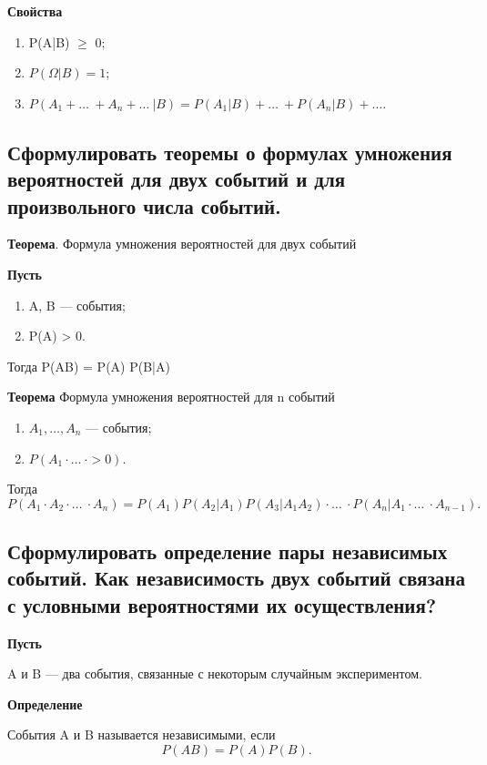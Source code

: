 \textbf{Свойства}

\begin{enumerate}
	\item P(A|B) $\geqslant$ 0;
	\item $P(\Omega|B) = 1$;
	\item $P(A_1 + \dots\ + A_n + \dots\ | B) = P(A_1|B) + \dots\ + P(A_n|B) + \dots$.
\end{enumerate}

\subsection{Сформулировать теоремы о формулах умножения вероятностей для двух событий и для произвольного числа событий.}

\textbf{Теорема}. Формула умножения вероятностей для двух событий 

\textbf{Пусть}

\begin{enumerate}
	\item A, B --- события;
	\item P(A) > 0.
\end{enumerate}

Тогда P(AB) = P(A) P(B|A)

\textbf{Теорема} Формула умножения вероятностей для n событий

\begin{enumerate}
	\item $A_1, \dots, A_n$ --- события;
	\item $P(A_1 \cdot \dots\ \cdot > 0)$.
\end{enumerate}
Тогда 
\begin{equation}
	P(A_1 \cdot A_2 \cdot \dots\ \cdot A_n)  = P(A_1) P(A_2 | A_1)P(A_3|A_1A_2) \cdot \dots\ \cdot P(A_n|A_1 \cdot \dots\ \cdot  A_{n-1}).
\end{equation}

\subsection{Сформулировать определение пары независимых событий. Как независимость двух событий связана с условными вероятностями их осуществления?}

\textbf{Пусть}

A и B --- два события, связанные с некоторым случайным экспериментом.

\textbf{Определение}

События A и B называется независимыми, если
\begin{equation}
	P(AB) = P(A) P(B).
\end{equation} 

